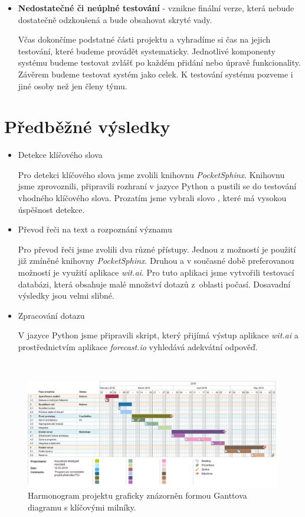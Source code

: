 \documentclass[12pt,a4paper]{article}
\begin{document}
\begin{itemize}
	\item{\textbf{Nedostatečné či neúplné testování}} - vznikne finální verze, která nebude dostatečně odzkoušená a bude obsahovat skryté vady.
	
	Včas dokončíme podstatné části projektu a vyhradíme si čas na jejich testování, které budeme provádět systematicky. Jednotlivé komponenty systému budeme testovat zvlášť po každém přidání nebo úpravě funkcionality. Závěrem budeme testovat systém jako celek. K testování systému pozveme i jiné osoby než jen členy týmu. 
	
\end{itemize}



\section*{Předběžné výsledky}
\begin{itemize}
  \item{Detekce klíčového slova}

  Pro detekci klíčového slova jsme zvolili knihovnu \textit{PocketSphinx}. Knihovnu jsme zprovoznili, připravili rozhraní v jazyce Python a pustili se do testování vhodného klíčového slova. Prozatím jsme vybrali slovo , které má vysokou úspěšnost detekce.

  \item{Převod řeči na text a rozpoznání významu}

  Pro převod řeči jsme zvolili dva různé přístupy. Jednou z možností je použití již zmíněné knihovny \textit{PocketSphinx}. Druhou a v současné době preferovanou možností je využití aplikace \textit{wit.ai}. Pro tuto aplikaci jsme vytvořili testovací databázi, která obsahuje malé množství dotazů z~oblasti počasí. Dosavadní výsledky jsou velmi slibné.

  \item{Zpracování dotazu}

  V jazyce Python jsme připravili skript, který přijímá výstup aplikace \textit{wit.ai} a prostřednictvím aplikace \textit{forecast.io} vyhledává adekvátní odpověď.

\end{itemize}

\begin{landscape}
~\vfill
\begin{figure}[ht]
	\begin{center}
	\includegraphics[height = 0.6\textheight ]{PTO-Gantt.png}
	\caption{Harmonogram projektu graficky znázorněn formou Ganttova diagramu s klíčovými milníky.}
	\label{fig:diagram gantt}
	\end{center}
\end{figure}
\vfill
\end{landscape}
\end{document}
